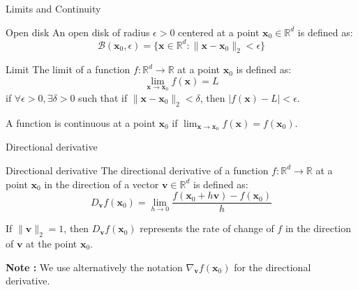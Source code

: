 \documentclass[aspectratio=1610]{beamer}
\begin{document}
\begin{frame}{Limits and Continuity}
  \begin{block}{Open disk}
    An open disk of radius $\epsilon > 0$ centered at a point $\mathbf{x}_0 \in \mathbb{R}^d$ is defined as:
    $$\mathcal{B}(\mathbf{x}_0, \epsilon) = \{\mathbf{x} \in \mathbb{R}^d : \|\mathbf{x} - \mathbf{x}_0\|_2 < \epsilon\}$$
  \end{block}

  \begin{block}{Limit}
    The limit of a function $f:\mathbb{R}^d \to \mathbb{R}$ at a point $\mathbf{x}_0$ is defined as:
    $$\lim_{\mathbf{x} \to \mathbf{x}_0} f(\mathbf{x}) = L$$
    if $\forall \epsilon > 0, \exists \delta > 0$ such that if $\|\mathbf{x} - \mathbf{x}_0\|_2 < \delta$, then $|f(\mathbf{x}) - L| < \epsilon$.
  \end{block}

  A function is continuous at a point $\mathbf{x}_0$ if $\lim_{\mathbf{x} \to \mathbf{x}_0} f(\mathbf{x}) = f(\mathbf{x}_0)$.
\end{frame}

\begin{frame}{Directional derivative}

  \begin{block}{Directional derivative}
    The directional derivative of a function $f:\mathbb{R}^d \to \mathbb{R}$ at a point $\mathbf{x}_0$ in the direction of a vector $\mathbf{v} \in \mathbb{R}^d$ is defined as:
    $$D_{\mathbf{v}}f(\mathbf{x}_0) = \lim_{h \to 0} \frac{f(\mathbf{x}_0 + h\mathbf{v}) - f(\mathbf{x}_0)}{h}$$
  \end{block}

  If $\|\mathbf{v}\|_2 = 1$, then $D_{\mathbf{v}}f(\mathbf{x}_0)$ represents the rate of change of $f$ in the direction of $\mathbf{v}$ at the point $\mathbf{x}_0$.
 
  \textbf{Note :} We use alternatively the notation $\nabla_{\mathbf{v}}f(\mathbf{x}_0)$ for the directional derivative.

\end{frame}
\end{document}
